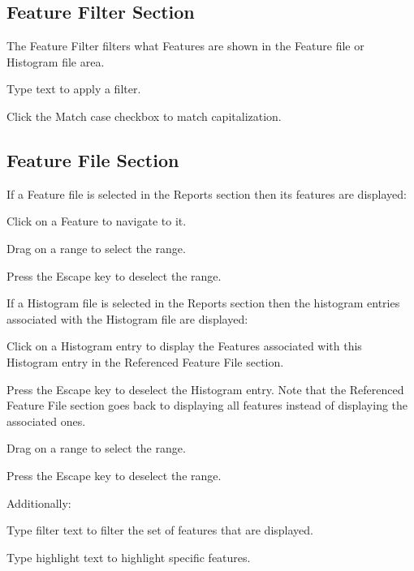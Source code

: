 \documentclass[10pt,twoside]{article}
\begin{document}
\subsection{Feature Filter Section}
The Feature Filter filters what Features are shown in the Feature file or Histogram file area.
\begin{compactitem}
\item Type text to apply a filter.
\item Click the Match case checkbox to match capitalization.
\end{compactitem}
\subsection{Feature File Section}
If a Feature file is selected in the Reports section then its features are displayed:
\begin{compactitem}
\item Click on a Feature to navigate to it.
\item Drag on a range to select the range.
\item Press the Escape key to deselect the range.
\end{compactitem}
If a Histogram file is selected in the Reports section then the histogram entries
associated with the Histogram file are displayed:
\begin{compactitem}
\item Click on a Histogram entry to display the Features associated with this Histogram entry
in the Referenced Feature File section.
\item Press the Escape key to deselect the Histogram entry.
Note that the Referenced Feature File section goes back to displaying all features
instead of displaying the associated ones.
\item Drag on a range to select the range.
\item Press the Escape key to deselect the range.
\end{compactitem}
Additionally:
\begin{compactitem}
\item Type filter text to filter the set of features that are displayed.
\item Type highlight text to highlight specific features.
\end{compactitem}
\end{document}
